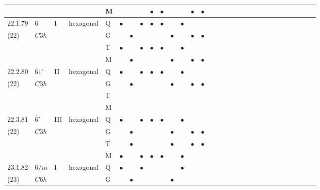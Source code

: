 \documentclass[fleqn,9pt,landscape]{jsarticle}
\begin{document}
\begin{longtable}{lllll|l|l|l|l|l|l|l|l|l|ll|ll|ll|ll|ll|ll|ll|ll}
 &  &  &  & M &  &  &  & $\bullet$ & $\bullet$ &  &  & $\bullet$ & $\bullet$ &  &  &  &  &  &  &  &  &  &  &  &  &  &  &  &  \\ \hline
22.1.79 & \texttt{$\bar{6}$} & I & hexagonal & Q & $\bullet$ &  & $\bullet$ & $\bullet$ & $\bullet$ &  & $\bullet$ &  &  &  &  &  &  &  &  &  &  &  &  &  &  &  &  &  &  \\
(22) & $C3h$ &  &  & G &  & $\bullet$ &  &  &  & $\bullet$ &  & $\bullet$ & $\bullet$ &  &  &  &  &  &  &  &  &  &  &  &  &  &  &  &  \\
 &  &  &  & T & $\bullet$ &  & $\bullet$ & $\bullet$ & $\bullet$ &  & $\bullet$ &  &  &  &  &  &  &  &  &  &  &  &  &  &  &  &  &  &  \\
 &  &  &  & M &  & $\bullet$ &  &  &  & $\bullet$ &  & $\bullet$ & $\bullet$ &  &  &  &  &  &  &  &  &  &  &  &  &  &  &  &  \\ \hline
22.2.80 & \texttt{$\bar{6}1'$} & II & hexagonal & Q & $\bullet$ &  & $\bullet$ & $\bullet$ & $\bullet$ &  & $\bullet$ &  &  &  &  &  &  &  &  &  &  &  &  &  &  &  &  &  &  \\
(22) & $C3h$ &  &  & G &  & $\bullet$ &  &  &  & $\bullet$ &  & $\bullet$ & $\bullet$ &  &  &  &  &  &  &  &  &  &  &  &  &  &  &  &  \\
 &  &  &  & T &  &  &  &  &  &  &  &  &  &  &  &  &  &  &  &  &  &  &  &  &  &  &  &  &  \\
 &  &  &  & M &  &  &  &  &  &  &  &  &  &  &  &  &  &  &  &  &  &  &  &  &  &  &  &  &  \\ \hline
22.3.81 & \texttt{$\bar{6}'$} & III & hexagonal & Q & $\bullet$ &  & $\bullet$ & $\bullet$ & $\bullet$ &  & $\bullet$ &  &  &  &  &  &  &  &  &  &  &  &  &  &  &  &  &  &  \\
(22) & $C3h$ &  &  & G &  & $\bullet$ &  &  &  & $\bullet$ &  & $\bullet$ & $\bullet$ &  &  &  &  &  &  &  &  &  &  &  &  &  &  &  &  \\
 &  &  &  & T &  & $\bullet$ &  &  &  & $\bullet$ &  & $\bullet$ & $\bullet$ &  &  &  &  &  &  &  &  &  &  &  &  &  &  &  &  \\
 &  &  &  & M & $\bullet$ &  & $\bullet$ & $\bullet$ & $\bullet$ &  & $\bullet$ &  &  &  &  &  &  &  &  &  &  &  &  &  &  &  &  &  &  \\ \hline
23.1.82 & \texttt{$6/m$} & I & hexagonal & Q & $\bullet$ &  & $\bullet$ &  &  &  & $\bullet$ &  &  &  &  &  &  &  &  &  &  &  &  &  &  &  &  &  &  \\
(23) & $C6h$ &  &  & G &  & $\bullet$ &  &  &  & $\bullet$ &  &  &  &  &  &  &  &  &  &  &  &  &  &  &  &  &  &  &  \\

\end{longtable}
\end{document}
